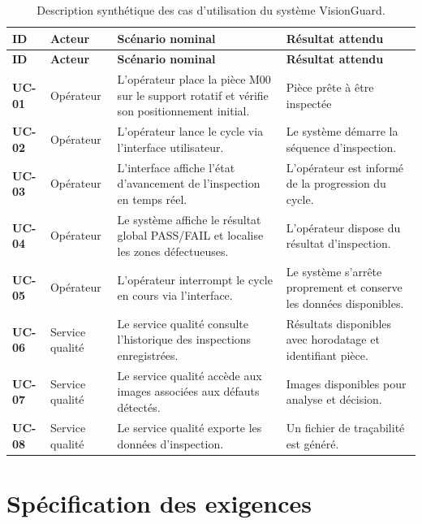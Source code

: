 \renewcommand{\arraystretch}{1.3}
\small
\begin{longtable}{|p{1.27cm}|p{2.5cm}|p{6cm}|p{5.23cm}|}
\caption{Description synthétique des cas d'utilisation du système VisionGuard.}
\label{tab:usecase} \\
\hline
\rowcolor{navyblue}
\textbf{\color{white}ID} & \textbf{\color{white}Acteur} & \textbf{\color{white}Scénario nominal} & \textbf{\color{white}Résultat attendu} \\
\hline
\endfirsthead
\hline
\rowcolor{navyblue}
\textbf{\color{white}ID} & \textbf{\color{white}Acteur} & \textbf{\color{white}Scénario nominal} & \textbf{\color{white}Résultat attendu} \\
\hline
\endhead
\hline
\endfoot
\textbf{UC-01} & Opérateur
    & L'opérateur place la pièce M00 sur le support rotatif et vérifie son positionnement initial.
    & Pièce prête à être inspectée \\ \hline
\textbf{UC-02} & Opérateur
    & L'opérateur lance le cycle via l'interface utilisateur.
    & Le système démarre la séquence d'inspection. \\ \hline
\textbf{UC-03} & Opérateur
    & L'interface affiche l'état d'avancement de l'inspection en temps réel.
    & L'opérateur est informé de la progression du cycle. \\ \hline
\textbf{UC-04} & Opérateur
    & Le système affiche le résultat global PASS/FAIL et localise les zones défectueuses.
    & L'opérateur dispose du résultat d'inspection. \\ \hline
\textbf{UC-05} & Opérateur
    & L'opérateur interrompt le cycle en cours via l'interface.
    & Le système s'arrête proprement et conserve les données disponibles. \\ \hline
\textbf{UC-06} & Service qualité
    & Le service qualité consulte l'historique des inspections enregistrées.
    & Résultats disponibles avec horodatage et identifiant pièce. \\ \hline
\textbf{UC-07} & Service qualité
    & Le service qualité accède aux images associées aux défauts détectés.
    & Images disponibles pour analyse et décision. \\ \hline
\textbf{UC-08} & Service qualité
    & Le service qualité exporte les données d'inspection.
    & Un fichier de traçabilité est généré. \\ \hline
\end{longtable}

\newpage
\section{Spécification des exigences}

